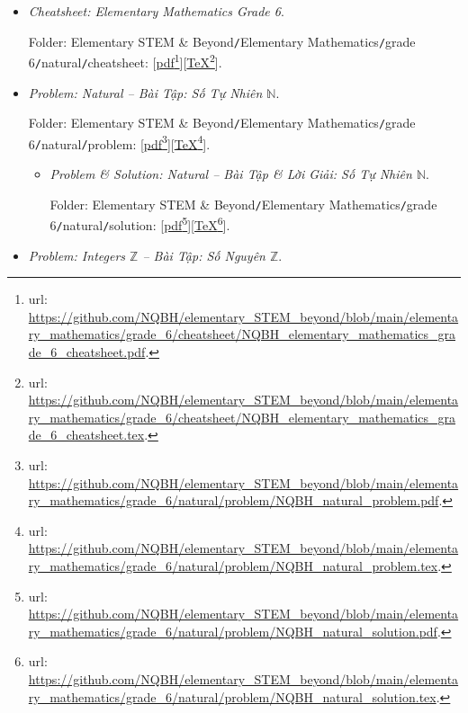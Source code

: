 \documentclass[12pt]{article}
\begin{document}
\begin{itemize}
	\item {\it Cheatsheet: Elementary Mathematics Grade 6}.
	
	Folder: {\sf Elementary STEM \& Beyond{\tt/}Elementary Mathematics{\tt/}grade 6{\tt/}natural{\tt/}cheatsheet}: [\href{https://github.com/NQBH/elementary_STEM_beyond/blob/main/elementary_mathematics/grade_6/cheatsheet/NQBH_elementary_mathematics_grade_6_cheatsheet.pdf}{pdf}\footnote{{\sc url}: \url{https://github.com/NQBH/elementary_STEM_beyond/blob/main/elementary_mathematics/grade_6/cheatsheet/NQBH_elementary_mathematics_grade_6_cheatsheet.pdf}.}][\href{https://github.com/NQBH/elementary_STEM_beyond/blob/main/elementary_mathematics/grade_6/cheatsheet/NQBH_elementary_mathematics_grade_6_cheatsheet.tex}{\TeX}\footnote{{\sc url}: \url{https://github.com/NQBH/elementary_STEM_beyond/blob/main/elementary_mathematics/grade_6/cheatsheet/NQBH_elementary_mathematics_grade_6_cheatsheet.tex}.}].
	\item {\it Problem: Natural -- Bài Tập: Số Tự Nhiên $\mathbb{N}$}.
	
	Folder: {\sf Elementary STEM \& Beyond{\tt/}Elementary Mathematics{\tt/}grade 6{\tt/}natural{\tt/}problem}: [\href{https://github.com/NQBH/elementary_STEM_beyond/blob/main/elementary_mathematics/grade_6/natural/problem/NQBH_natural_problem.pdf}{pdf}\footnote{{\sc url}: \url{https://github.com/NQBH/elementary_STEM_beyond/blob/main/elementary_mathematics/grade_6/natural/problem/NQBH_natural_problem.pdf}.}][\href{https://github.com/NQBH/elementary_STEM_beyond/blob/main/elementary_mathematics/grade_6/natural/problem/NQBH_natural_problem.tex}{\TeX}\footnote{{\sc url}: \url{https://github.com/NQBH/elementary_STEM_beyond/blob/main/elementary_mathematics/grade_6/natural/problem/NQBH_natural_problem.tex}.}].
	\begin{itemize}
		\item {\it Problem \& Solution: Natural -- Bài Tập \& Lời Giải: Số Tự Nhiên $\mathbb{N}$}.
		
		Folder: {\sf Elementary STEM \& Beyond{\tt/}Elementary Mathematics{\tt/}grade 6{\tt/}natural{\tt/}solution}: [\href{https://github.com/NQBH/elementary_STEM_beyond/blob/main/elementary_mathematics/grade_6/natural/problem/NQBH_natural_solution}{pdf}\footnote{{\sc url}: \url{https://github.com/NQBH/elementary_STEM_beyond/blob/main/elementary_mathematics/grade_6/natural/problem/NQBH_natural_solution.pdf}.}][\href{https://github.com/NQBH/elementary_STEM_beyond/blob/main/elementary_mathematics/grade_6/natural/problem/NQBH_natural_solution.tex}{\TeX}\footnote{{\sc url}: \url{https://github.com/NQBH/elementary_STEM_beyond/blob/main/elementary_mathematics/grade_6/natural/problem/NQBH_natural_solution.tex}.}].
	\end{itemize}
	\item {\it Problem: Integers $\mathbb{Z}$ -- Bài Tập: Số Nguyên $\mathbb{Z}$}.
	

\end{itemize}
\end{document}

